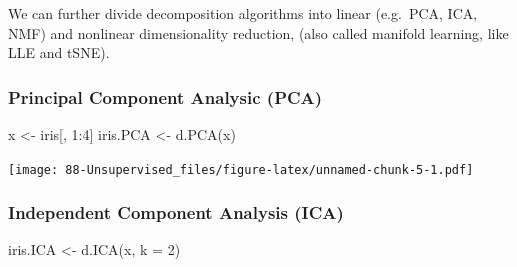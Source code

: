 \documentclass[
]{book}
\newenvironment{Shaded}{\begin{snugshade}}{\end{snugshade}}
\newcommand{\AttributeTok}[1]{\textcolor[rgb]{0.77,0.63,0.00}{#1}}
\newcommand{\DecValTok}[1]{\textcolor[rgb]{0.00,0.00,0.81}{#1}}
\newcommand{\FunctionTok}[1]{\textcolor[rgb]{0.00,0.00,0.00}{#1}}
\newcommand{\NormalTok}[1]{#1}
\newcommand{\OtherTok}[1]{\textcolor[rgb]{0.56,0.35,0.01}{#1}}
\newcommand{\SpecialCharTok}[1]{\textcolor[rgb]{0.00,0.00,0.00}{#1}}
\newcommand{\StringTok}[1]{\textcolor[rgb]{0.31,0.60,0.02}{#1}}
\begin{document}
We can further divide decomposition algorithms into linear (e.g.~PCA, ICA, NMF) and nonlinear dimensionality reduction, (also called manifold learning, like LLE and tSNE).

\hypertarget{principal-component-analysic-pca}{%
\subsubsection{Principal Component Analysic (PCA)}\label{principal-component-analysic-pca}}

\begin{Shaded}
\begin{Highlighting}[]
\NormalTok{x }\OtherTok{\textless{}{-}}\NormalTok{ iris[, }\DecValTok{1}\SpecialCharTok{:}\DecValTok{4}\NormalTok{]}
\NormalTok{iris.PCA }\OtherTok{\textless{}{-}} \FunctionTok{d.PCA}\NormalTok{(x)}
\end{Highlighting}
\end{Shaded}

\begin{Shaded}
\end{Shaded}

\texttt{[image: 88-Unsupervised\_files/figure-latex/unnamed-chunk-5-1.pdf]}

\hypertarget{independent-component-analysis-ica}{%
\subsubsection{Independent Component Analysis (ICA)}\label{independent-component-analysis-ica}}

\begin{Shaded}
\begin{Highlighting}[]
\NormalTok{iris.ICA }\OtherTok{\textless{}{-}} \FunctionTok{d.ICA}\NormalTok{(x, }\AttributeTok{k =} \DecValTok{2}\NormalTok{)}
\end{Highlighting}
\end{Shaded}
\end{document}

